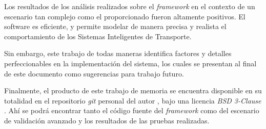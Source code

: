 Los resultados de los análisis realizados sobre el \emph{framework} en el contexto de un escenario tan complejo como el proporcionado fueron altamente positivos. El software es eficiente, y permite modelar de manera precisa y realista el comportamiento de los Sistemas Inteligentes de Transporte.

Sin embargo, este trabajo de todas maneras identifica factores y detalles perfeccionables en la implementación del sistema, los cuales se presentan al final de este documento como sugerencias para trabajo futuro. 

Finalmente, el producto de este trabajo de memoria se encuentra disponible en su totalidad en el repositorio \emph{git} personal del autor \autocite{pveins_github}, bajo una licencia \emph{BSD 3-Clause} \autocite{bsd3clause}. Ahí se podrá encontrar tanto el código fuente del \emph{framework} como del escenario de validación avanzado y los resultados de las pruebas realizadas.